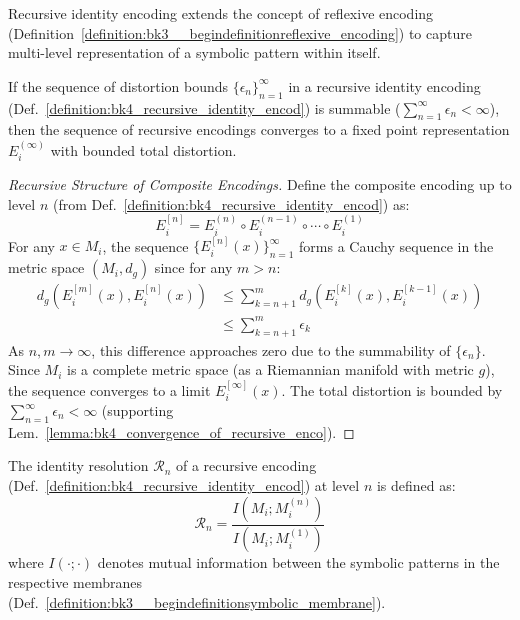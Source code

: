 Recursive identity encoding extends the concept of reflexive encoding (Definition~\ref{definition:bk3__begindefinitionreflexive_encoding}) to capture multi-level representation of a symbolic pattern within itself.
\begin{lemma} \label{lemma:bk4_convergence_of_recursive_enco}
If the sequence of distortion bounds $\{\epsilon_n\}_{n=1}^{\infty}$ in a recursive identity encoding (Def.~\ref{definition:bk4_recursive_identity_encod}) is summable ($\sum_{n=1}^{\infty} \epsilon_n < \infty$), then the sequence of recursive encodings converges to a fixed point representation $E_i^{(\infty)}$ with bounded total distortion.
\end{lemma}
\begin{proof}[Recursive Structure of Composite Encodings]
\label{proof:bk4_recursive_composite_encoding}
Define the composite encoding up to level $n$ (from Def.~\ref{definition:bk4_recursive_identity_encod}) as:
\begin{equation}
    E_i^{[n]} = E_i^{(n)} \circ E_i^{(n-1)} \circ \cdots \circ E_i^{(1)} \label{eq:bk4_composite_encoding_proof}
\end{equation}
For any $x \in M_i$, the sequence $\{E_i^{[n]}(x)\}_{n=1}^{\infty}$ forms a Cauchy sequence in the metric space $(M_i, d_g)$ since for any $m > n$:
\begin{align}
    d_g(E_i^{[m]}(x), E_i^{[n]}(x)) &\leq \sum_{k=n+1}^{m} d_g(E_i^{[k]}(x), E_i^{[k-1]}(x)) \label{eq:bk4_cauchy_sum_epsilon_proof_step1} \\
    &\leq \sum_{k=n+1}^{m} \epsilon_k \label{eq:bk4_cauchy_sum_epsilon_proof_step2}
\end{align}
As $n, m \to \infty$, this difference approaches zero due to the summability of $\{\epsilon_n\}$. Since $M_i$ is a complete metric space (as a Riemannian manifold with metric $g$), the sequence converges to a limit $E_i^{[\infty]}(x)$. The total distortion is bounded by $\sum_{n=1}^{\infty} \epsilon_n < \infty$ (supporting Lem.~\ref{lemma:bk4_convergence_of_recursive_enco}).
\end{proof}
\begin{definition} \label{definition:bk4_identity_resolution}
The identity resolution $\mathcal{R}_n$ of a recursive encoding (Def.~\ref{definition:bk4_recursive_identity_encod}) at level $n$ is defined as:
\begin{equation}
    \mathcal{R}_n = \frac{I(M_i; M_i^{(n)})}{I(M_i; M_i^{(1)})} \label{eq:bk4_identity_resolution_formula_def}
\end{equation}
where $I(\cdot;\cdot)$ denotes mutual information between the symbolic patterns in the respective membranes (Def.~\ref{definition:bk3__begindefinitionsymbolic_membrane}).
\end{definition}
